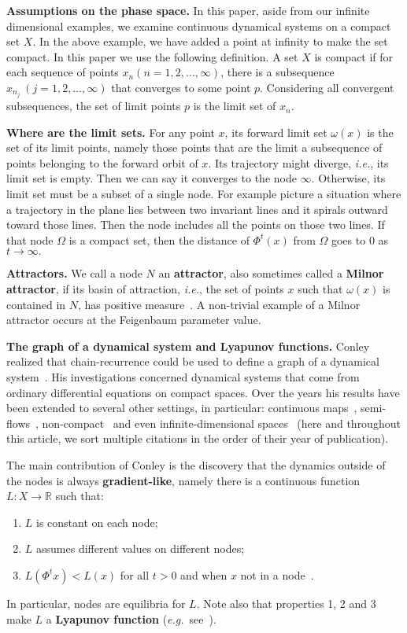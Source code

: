 \documentclass{article}
\newcommand{\allred}{\color{red}{}}
\newcommand{\ie}{{\it{i.e.}}}
\newcommand{\eg}{{\it{e.g.}}}
\def\bR{\mathbb{R}}
\begin{document}
{\bf Assumptions on the phase space.}
In this paper, aside from our infinite dimensional examples, we examine continuous dynamical systems on a compact set $X$.
In the above example, we have added a point at infinity to make the set compact. In this paper we use the following definition. A set $X$ is compact if for each sequence of points $x_n (n = 1,2,\dots,\infty)$, there is a subsequence $x_{n_j} ~(j = 1,2,\dots,\infty)$ that converges to some point $p$. Considering all convergent subsequences, the set of limit points $p$ is the limit set of 
$x_n$.

{\bf Where are the limit sets.}
For any point $x$, its forward limit set $\omega(x)$ is the set of its limit points, namely those points that are the limit a subsequence of points belonging to the forward orbit of $x$. 
Its trajectory might diverge, \ie, its limit set is empty. Then we can say it converges to the node $\infty.$
Otherwise, its limit set 
must be a subset of a single node.
For example picture a situation where a trajectory in the plane lies between two invariant lines and it spirals outward toward those lines. 
Then the node includes all the points on those two lines.
If that node $\Omega$ is a compact set, then the distance of $\Phi^t(x)$ from $\Omega$ goes to $0$ as $t\to\infty.$

{\bf Attractors.} We call a node $N$ an {\bf attractor}, also sometimes called a {\bf Milnor attractor}, if its basin of attraction, \ie, the set of points $x$ such that $\omega(x)$ is contained in $N$, has positive measure~\cite{Mil85}. 
A non-trivial example of a Milnor attractor occurs at the Feigenbaum parameter value. 

{\bf The graph of a dynamical system and Lyapunov functions.} 
Conley realized that chain-recurrence could be used to define a graph of a dynamical system~\cite{Con72,Con78}.
His investigations concerned dynamical systems that come from ordinary differential equations on compact spaces.
Over the years his results have been extended to several other settings, in particular: continuous maps~\cite{Nor95b}, semi-flows~\cite{Ryb87,HSZ01,Pat07}, non-compact~\cite{Hur91,Pat07} and even infinite-dimensional spaces~\cite{Ryb87,MP88,CP95,HMW06} (here and  throughout this article, we sort multiple citations in the order of their year of publication).

The main contribution of Conley is the discovery that the dynamics outside of the nodes is always {\bf gradient-like}, namely there is a continuous function $L:X\to\bR$ such that:
\begin{enumerate}
  \item $L$ is constant on each node; 
  \item $L$ assumes different values on different nodes;
  \item $L(\Phi^tx)< L(x)$ for all $t>0$ and when $x$ not in a node~\cite{MM02}.
\end{enumerate}
%
In particular, nodes are equilibria for $L$. 
Note also that properties 1, 2 and 3 make $L$ a {\bf Lyapunov function} (\eg~see~\cite{WY73,Nor95b}).
\end{document}
